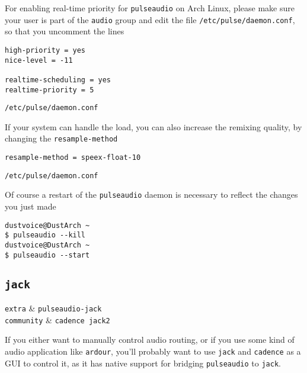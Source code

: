 \documentclass[10pt]{dustdoc}
\begin{document}
For enabling real-time priority for \texttt{pulseaudio} on Arch Linux, please make sure your user is part of the \texttt{audio} group and edit the file \texttt{/etc/pulse/daemon.conf}, so that you uncomment the lines

\begin{mintedlisting}
    \begin{verbatim}
high-priority = yes
nice-level = -11

realtime-scheduling = yes
realtime-priority = 5
    \end{verbatim}

    \caption{\texttt{/etc/pulse/daemon.conf}}
\end{mintedlisting}

If your system can handle the load, you can also increase the remixing quality, by changing the \texttt{resample-method}

\begin{mintedlisting}
    \begin{verbatim}
resample-method = speex-float-10
    \end{verbatim}

    \caption{\texttt{/etc/pulse/daemon.conf}}
\end{mintedlisting}

Of course a restart of the \texttt{pulseaudio} daemon is necessary to reflect the changes you just made

\begin{verbatim}
dustvoice@DustArch ~
$ pulseaudio --kill
dustvoice@DustArch ~
$ pulseaudio --start
\end{verbatim}

\subsection{\texttt{jack}}
\label{sec:jack}

\begin{packagetable}
    \texttt{extra} & \texttt{pulseaudio-jack} \\
    \texttt{community} & \texttt{cadence jack2} \\
\end{packagetable}

If you either want to manually control audio routing, or if you use some kind of audio application like \texttt{ardour}, you’ll probably want to use \texttt{jack} and \texttt{cadence} as a GUI to control it, as it has native support for bridging \texttt{pulseaudio} to \texttt{jack}.
\end{document}
